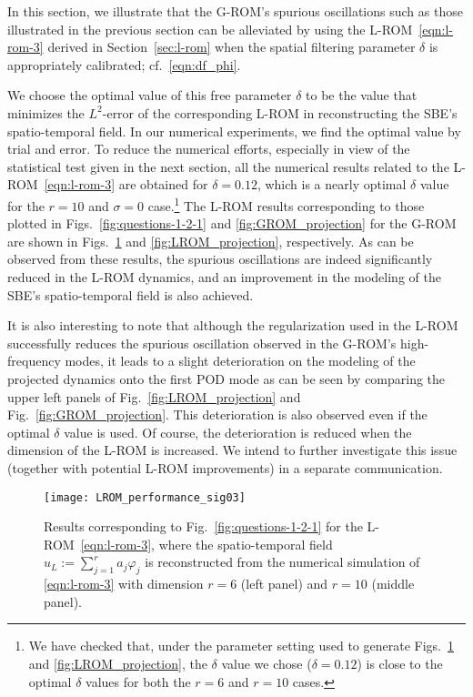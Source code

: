 \documentclass[11pt]{amsart}
\numberwithin{equation}{section}
\begin{document}
In this section, we illustrate that the G-ROM's spurious oscillations such as those illustrated in the previous section can be alleviated by using the L-ROM~\eqref{eqn:l-rom-3} derived in Section~\ref{sec:l-rom} when the spatial filtering parameter $\delta$  is appropriately calibrated; cf.~\eqref{eqn:df_phi}.

We choose the optimal value of this free parameter $\delta$ to be the value that minimizes the $L^2$-error of the corresponding L-ROM in reconstructing the SBE's spatio-temporal field. In our numerical experiments, we find the optimal value by trial and error.   To reduce the numerical efforts, especially in view of the statistical test given in the next section, all the numerical results related to the L-ROM~\eqref{eqn:l-rom-3} are obtained for $\delta = 0.12$, which is a nearly optimal $\delta$ value for the $r=10$ and $\sigma = 0$ case.\footnote{We have checked that, under the parameter setting used to generate Figs.~\ref{fig:question-3-1} and \ref{fig:LROM_projection}, the $\delta$ value we chose ($\delta = 0.12$) is close to the optimal $\delta$ values for both  the $r=6$ and $r=10$ cases.} The L-ROM results corresponding to those plotted in Figs.~\ref{fig:questions-1-2-1} and \ref{fig:GROM_projection} for the G-ROM are shown in Figs.~\ref{fig:question-3-1} and \ref{fig:LROM_projection}, respectively. As can be observed from these results, the spurious oscillations are indeed significantly reduced in the L-ROM dynamics, and an improvement in the modeling of the SBE's spatio-temporal field is also achieved. 

It is also interesting to note that although the regularization used in the L-ROM successfully reduces the spurious oscillation observed in the G-ROM's high-frequency modes, it leads to a slight deterioration on the modeling of the projected dynamics onto the first POD mode as can be seen by comparing the upper left panels of Fig.~\ref{fig:LROM_projection} and Fig.~\ref{fig:GROM_projection}. This deterioration is also observed even if the optimal $\delta$ value is used. Of course, the deterioration is reduced when the dimension of the L-ROM is increased. We intend to further investigate this issue (together with potential L-ROM improvements) in a separate communication. 




\begin{figure}[h]
	\texttt{[image: LROM\_performance\_sig03]}	
	\caption{
		Results corresponding to Fig.~\ref{fig:questions-1-2-1}  for the L-ROM~\eqref{eqn:l-rom-3}, where the spatio-temporal field $u_L:=\sum_{j=1}^r a_j \varphi_j$ is reconstructed from the numerical simulation of \eqref{eqn:l-rom-3} with dimension $r=6$ (left panel) and $r=10$ (middle panel).
	}
	\label{fig:question-3-1} 
\end{figure}
\end{document}

